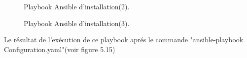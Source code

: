 {\begin{figure}[H]
\begin{center}
    \end{center}
    \caption{Playbook Ansible d'installation(2).}
   \end{figure}
   \begin{figure}[H]
    \begin{center}
    \end{center}
    \caption{Playbook Ansible d'installation(3).}
   \end{figure}
   \indent\indent Le résultat de l'exécution de ce playbook aprés le commande "ansible-playbook Configuration.yaml"(voir figure 5.15)
   \begin{figure}[H]
    \begin{center}

\end{center}
\end{figure}}
